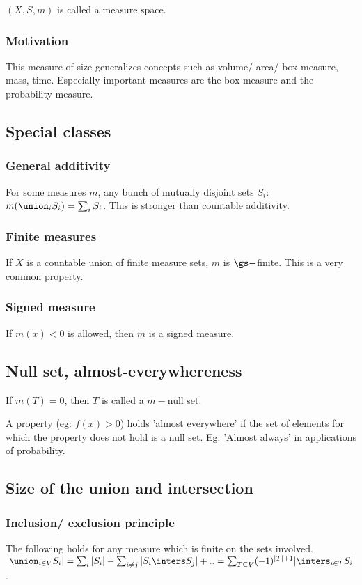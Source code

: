 \documentclass[oneside, article]{memoir}
\begin{document}
$(X, S, m)$ is called a measure space.

\subsubsection{Motivation}
This measure of size generalizes concepts such as volume/ area/ box measure, mass, time. Especially important measures are the box measure and the probability measure.

\subsection{Special classes}
\subsubsection{General additivity}
For some measures $m$, any bunch of mutually disjoint sets $S_i$: $m(\union_i S_i) = \sum_i S_i$. This is stronger than countable additivity.

\subsubsection{Finite measures}
If $X$ is a countable union of finite measure sets, $m$ is $\gs-$finite. This is a very common property.

\subsubsection{Signed measure}
If $m(x) < 0$ is allowed, then $m$ is a signed measure.

\subsection{Null set, almost-everywhereness}
If $m(T) = 0$, then $T$ is called a $m-$null set.

A property (eg: $f(x)>0$) holds 'almost everywhere' if the set of elements for which the property does not hold is a null set. Eg: 'Almost always' in applications of probability.

\subsection{Size of the union and intersection}
\subsubsection{Inclusion/ exclusion principle}
The following holds for any measure which is finite on the sets involved. $|\union_{i \in V} S_i| = \sum_i |S_i| - \sum_{i \neq j}|S_i \inters S_j| + .. = \sum_{T \subseteq V} (-1)^{|T|+1}|\inters_{i \in T}S_i|$.
\end{document}
